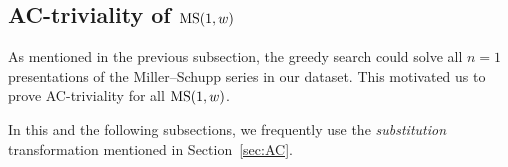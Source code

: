 \subsection{AC-triviality of $\text{MS}(1, w)$} \label{sec:ms1w_}

As mentioned in the previous subsection, the greedy search could solve all $n=1$ presentations of the Miller--Schupp series in our dataset. This motivated us to prove AC-triviality for all $\text{MS}(1, w)$. 

In this and the following subsections, we frequently use the \emph{substitution} transformation mentioned in Section~\ref{sec:AC}.   




